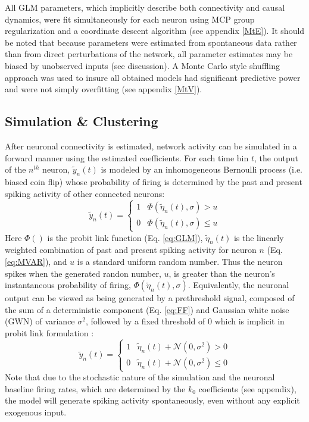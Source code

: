 \documentclass[journal,twoside,web]{ieeecolor}
\begin{document}
All GLM parameters, which implicitly describe both connectivity and causal dynamics, were fit simultaneously for each neuron using MCP group regularization and a coordinate descent algorithm (see appendix \ref{MtE}).
It should be noted that because parameters were estimated from spontaneous data rather than from direct perturbations of the network, all parameter estimates may be biased by unobserved inputs (see discussion).
A Monte Carlo style shuffling approach was used to insure all obtained models had significant predictive power and were not simply overfitting (see appendix \ref{MtV}).

\subsection{Simulation \& Clustering}
After neuronal connectivity is estimated, network activity can be simulated in a forward manner using the estimated coefficients. 
For each time bin $t$, the output of the $n^{th}$ neuron, $\tilde{y}_n(t)$ is modeled by an inhomogeneous Bernoulli process (i.e. biased coin flip) whose probability of firing is determined by the past and present spiking activity of other connected neurons: 
\begin{equation}
\tilde{y}_n(t) =
\begin{cases}
1   & \Phi(\tilde{\eta}_n(t),\sigma) > u        \\
0   & \Phi(\tilde{\eta}_n(t),\sigma) \leq u
\end{cases}
\label{eq:simul}
\end{equation}
Here $\Phi()$ is the probit link function (Eq. \ref{eq:GLM}), $\tilde{\eta}_n(t)$ is the linearly weighted combination of past and present spiking activity for neuron $n$ (Eq. \ref{eq:MVAR}), and $u$ is a standard uniform random number.
Thus the neuron spikes when the generated randon number, $u$, is greater than the neuron's instantaneous probability of firing, $\Phi(\tilde{\eta}_n(t),\sigma)$.
Equivalently, the neuronal output can be viewed as being generated by a prethreshold signal, composed of the sum of a deterministic component (Eq. \ref{eq:FF}) and Gaussian white noise (GWN) of variance $\sigma^2$, followed by a fixed threshold of 0 which is implicit in probit link formulation \cite{berger12}:
\begin{equation}
\tilde{y}_n(t) =
\begin{cases}
1   & \tilde{\eta}_n(t) + \mathcal{N}(0,\sigma^2) > 0        \\
0   & \tilde{\eta}_n(t) + \mathcal{N}(0,\sigma^2) \leq 0
\end{cases}
\label{eq:simul2}
\end{equation}
Note that due to the stochastic nature of the simulation and the neuronal baseline firing rates, which are determined by the $k_0$ coefficients (see appendix), the model will generate spiking activity spontaneously, even without any explicit exogenous input. 
\end{document}
